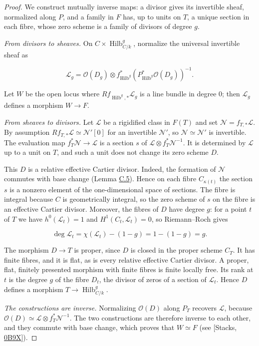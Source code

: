 \documentclass[11pt]{article}
\begin{document}
\begin{proof}[{Proof}]\label{bp25}%
We construct mutually inverse maps: a divisor gives its invertible sheaf, normalized along \(P\), and a family in \(F\) has, up to units on \(T\), a unique section in each fibre, whose zero scheme is a family of divisors of degree \(g\).

\emph{From divisors to sheaves.} On \(C\times \operatorname{Hilb}^{g}_{C/k}\), normalize the universal invertible sheaf as

\[
\mathcal L_g=\mathcal O(D_g)\otimes
f_{\operatorname{Hilb}^g}^*(P_{\operatorname{Hilb}^g}^*\mathcal O(D_g))^{-1}.
\]

Let \(W\) be the open locus where \(Rf_{\operatorname{Hilb}^g,*}\mathcal L_g\) is a line bundle in degree \(0\); then \(\mathcal L_g\) defines a morphism \(W\to F\).

\emph{From sheaves to divisors.} Let \(\mathcal L\) be a rigidified class in \(F(T)\) and set \(\mathcal N=f_{T,*}\mathcal L\). By assumption \(Rf_{T,*}\mathcal L\simeq\mathcal N'[0]\) for an invertible \(\mathcal N'\), so \(\mathcal N\simeq\mathcal N'\) is invertible. The evaluation map \(f_T^*\mathcal N\to\mathcal L\) is a section \(s\) of \(\mathcal L\otimes f_T^*\mathcal N^{-1}\). It is determined by \(\mathcal L\) up to a unit on \(T\), and such a unit does not change its zero scheme \(D\).

This \(D\) is a relative effective Cartier divisor. Indeed, the formation of \(\mathcal N\) commutes with base change (Lemma \hyperref[bp17]{C.5}). Hence on each fibre \(C_{\kappa(t)}\) the section \(s\) is a nonzero element of the one-dimensional space of sections. The fibre is integral because \(C\) is geometrically integral, so the zero scheme of \(s\) on the fibre is an effective Cartier divisor. Moreover, the fibres of \(D\) have degree \(g\): for a point \(t\) of \(T\) we have \(h^0(\mathcal L_t)=1\) and \(H^1(C_t,\mathcal L_t)=0\), so Riemann–Roch gives

\[
\deg\mathcal L_t
=\chi(\mathcal L_t)-(1-g)=1-(1-g)=g.
\]

The morphism \(D\to T\) is proper, since \(D\) is closed in the proper scheme \(C_T\). It has finite fibres, and it is flat, as is every relative effective Cartier divisor. A proper, flat, finitely presented morphism with finite fibres is finite locally free. Its rank at \(t\) is the degree \(g\) of the fibre \(D_t\), the divisor of zeros of a section of \(\mathcal L_t\). Hence \(D\) defines a morphism \(T\to \operatorname{Hilb}^{g}_{C/k}\).

\emph{The constructions are inverse.} Normalizing \(\mathcal O(D)\) along \(P_T\) recovers \(\mathcal L\), because \(\mathcal O(D)\simeq\mathcal L\otimes f_T^*\mathcal N^{-1}\). The two constructions are therefore inverse to each other, and they commute with base change, which proves that \(W\simeq F\) (see [Stacks, \href{https://stacks.math.columbia.edu/tag/0B9X}{0B9X}]).
\end{proof}
\end{document}
